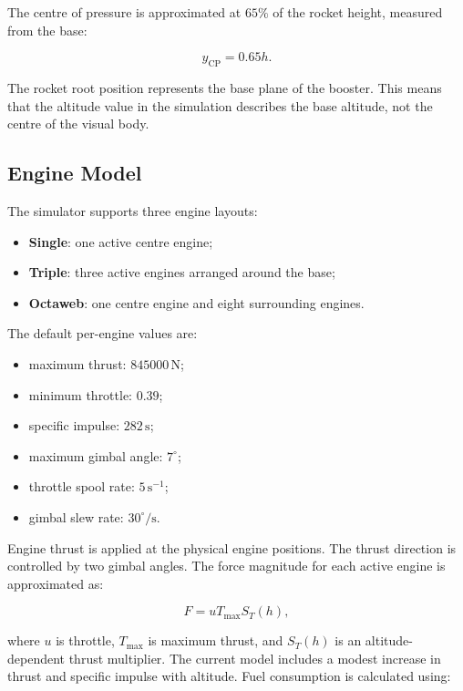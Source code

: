 \documentclass{article}
\begin{document}
The centre of pressure is approximated at \(65\%\) of the rocket height, measured from the base:

\begin{equation}
y_{\mathrm{CP}} = 0.65h.
\end{equation}

The rocket root position represents the base plane of the booster. This means that the altitude value in the simulation describes the base altitude, not the centre of the visual body.

\subsection{Engine Model}

The simulator supports three engine layouts:

\begin{itemize}
    \item \textbf{Single}: one active centre engine;
    \item \textbf{Triple}: three active engines arranged around the base;
    \item \textbf{Octaweb}: one centre engine and eight surrounding engines.
\end{itemize}

The default per-engine values are:

\begin{itemize}
    \item maximum thrust: \(845000\,\mathrm{N}\);
    \item minimum throttle: \(0.39\);
    \item specific impulse: \(282\,\mathrm{s}\);
    \item maximum gimbal angle: \(7^\circ\);
    \item throttle spool rate: \(5\,\mathrm{s^{-1}}\);
    \item gimbal slew rate: \(30^\circ/\mathrm{s}\).
\end{itemize}

Engine thrust is applied at the physical engine positions. The thrust direction is controlled by two gimbal angles. The force magnitude for each active engine is approximated as:

\begin{equation}
F = u T_{\max} S_T(h),
\end{equation}

where \(u\) is throttle, \(T_{\max}\) is maximum thrust, and \(S_T(h)\) is an altitude-dependent thrust multiplier. The current model includes a modest increase in thrust and specific impulse with altitude. Fuel consumption is calculated using:
\end{document}
